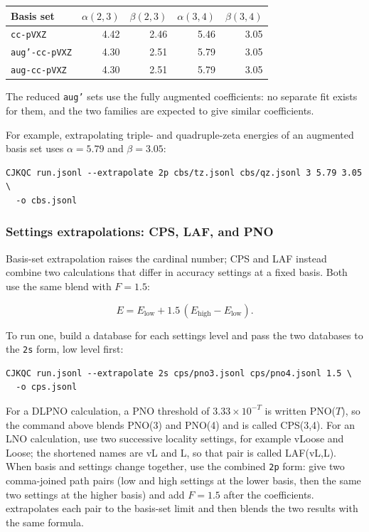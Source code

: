 \begin{center}
\begin{tabular}{@{}lrrrr@{}}
\toprule
Basis set & $\alpha(2,3)$ & $\beta(2,3)$ & $\alpha(3,4)$ & $\beta(3,4)$ \\
\midrule
\texttt{cc-pVXZ}      & 4.42 & 2.46 & 5.46 & 3.05 \\
\texttt{aug'-cc-pVXZ} & 4.30 & 2.51 & 5.79 & 3.05 \\
\texttt{aug-cc-pVXZ}  & 4.30 & 2.51 & 5.79 & 3.05 \\
\bottomrule
\end{tabular}
\end{center}

The reduced \texttt{aug'} sets use the fully augmented coefficients: no
separate fit exists for them, and the two families are expected to give
similar coefficients.

For example, extrapolating triple- and quadruple-zeta energies of an
augmented basis set uses $\alpha=5.79$ and $\beta=3.05$:

\begin{verbatim}
CJKQC run.jsonl --extrapolate 2p cbs/tz.jsonl cbs/qz.jsonl 3 5.79 3.05 \
  -o cbs.jsonl
\end{verbatim}

\subsubsection*{Settings extrapolations: CPS, LAF, and PNO}

Basis-set extrapolation raises the cardinal number; CPS and LAF instead
combine two calculations that differ in accuracy settings at a fixed basis.
Both use the same blend with $F=1.5$:

\begin{equation}
E = E_{\mathrm{low}} + 1.5\,(E_{\mathrm{high}} - E_{\mathrm{low}}).
\end{equation}

To run one, build a database for each settings level and pass the two
databases to the \texttt{2s} form, low level first:

\begin{verbatim}
CJKQC run.jsonl --extrapolate 2s cps/pno3.jsonl cps/pno4.jsonl 1.5 \
  -o cps.jsonl
\end{verbatim}

For a DLPNO calculation, a PNO threshold of $3.33\times10^{-T}$ is written
PNO($T$), so the command above blends PNO(3) and PNO(4) and is called
CPS(3,4). For an LNO calculation, use two successive locality settings, for
example vLoose and Loose; the shortened names are vL and L, so that pair is
called LAF(vL,L). When basis and settings change together, use the combined
\texttt{2p} form: give two comma-joined path pairs (low and high settings at
the lower basis, then the same two settings at the higher basis) and add
$F=1.5$ after the coefficients. \CJKQC{} extrapolates each pair to the
basis-set limit and then blends the two results with the same formula.

